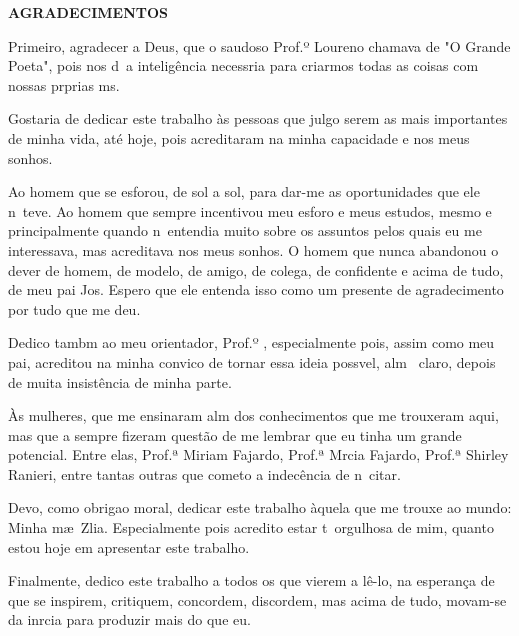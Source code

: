 
\label{tcc:agradecimentos}

\begin{center}
\textbf{AGRADECIMENTOS}
\end{center}

Primeiro, agradecer a Deus, que o saudoso Prof.º Louren\cc o chamava de "O Grande Poeta", pois nos d\ah\ a intelig\^encia necess\ah ria para criarmos todas as coisas com nossas pr\oh prias m\ao s.

Gostaria de dedicar este trabalho \`as pessoas que julgo serem as mais importantes de minha vida, at\'e hoje, pois acreditaram na minha capacidade e nos meus sonhos.

Ao homem que se esfor\cc ou, de sol a sol, para dar-me as oportunidades que ele n\ao\ teve. Ao homem que sempre incentivou meu esfor\cc o e meus estudos, mesmo e principalmente quando n\ao\ entendia muito sobre os assuntos pelos quais eu me interessava, mas acreditava nos meus sonhos. O homem que nunca abandonou o dever de homem, de modelo, de amigo, de colega, de confidente e acima de tudo, de meu pai Jos\eh . Espero que ele entenda isso como um presente de agradecimento por tudo que me deu.

Dedico tamb\eh m ao meu orientador, Prof.º \Orientador, especialmente pois, assim como meu pai, acreditou na minha convic\ca o de tornar essa ideia poss\ih vel, al\eh m \eh\ claro, depois de muita insist\^encia de minha parte.

\`As mulheres, que me ensinaram al\eh m dos conhecimentos que me trouxeram aqui, mas que a
sempre fizeram quest\~ao de me lembrar que eu tinha um grande potencial. Entre elas, Prof.ª Miriam Fajardo, Prof.ª M\ah rcia Fajardo, Prof.ª Shirley Ranieri, entre tantas outras que cometo a indec\^encia de n\ao\ citar.

Devo, como obriga\ca o moral, dedicar este trabalho \`aquela que me trouxe ao mundo: Minha m\ae\ Z\eh lia. Especialmente pois acredito estar t\ao\ orgulhosa de mim, quanto estou hoje em apresentar este trabalho.

Finalmente, dedico este trabalho a todos os que vierem a l\^e-lo, na esperan\c{c}a de que se inspirem, critiquem, concordem, discordem, mas acima de tudo, movam-se da in\eh rcia para produzir mais do que eu.
